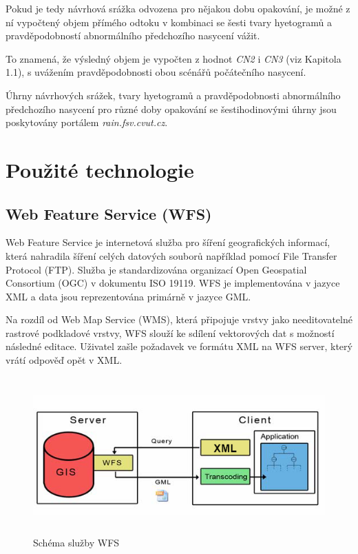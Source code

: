 \documentclass[a4paper,oneside,12pt]{book}
\begin{document}
\hspace{10mm} Pokud je tedy návrhová srážka odvozena pro nějakou dobu opakování, je možné z ní vypočtený objem přímého odtoku v kombinaci se šesti tvary  hyetogramů a pravděpodobností abnormálního předchozího nasycení vážit.

\hspace{10mm} To znamená, že výsledný objem je vypočten z hodnot \textit{CN2} i \textit{CN3} (viz Kapitola 1.1), s uvážením pravděpodobnosti obou scénářů počátečního nasycení.

\hspace{10mm} Úhrny návrhových srážek, tvary hyetogramů a pravděpodobnosti abnormálního předchozího nasycení pro různé doby opakování se šestihodinovými úhrny jsou poskytovány portálem \textit{rain.fsv.cvut.cz}.

\newpage
\newpage

\section{Použité technologie} \label{tehcnologie}

\subsection{Web Feature Service (WFS)} \label{wfs}
\hspace{10mm} Web Feature Service je internetová služba pro šíření geografických informací, která nahradila šíření celých datových souborů například pomocí File Transfer Protocol (FTP). Služba je standardizována organizací Open Geospatial Consortium (OGC) v dokumentu  ISO 19119. \cite{Vretanos2014} WFS je implementována v jazyce XML a data jsou reprezentována primárně v jazyce GML. \cite{Zhang2005}

\hspace{10mm} Na rozdíl od Web Map Service (WMS), která připojuje vrstvy jako needitovatelné rastrové podkladové vrstvy, WFS slouží ke sdílení vektorových dat s možností následné editace. Uživatel zašle požadavek ve formátu XML na WFS server, který vrátí odpověď opět v XML. \cite{Zhang2005}

\begin{figure}[ht] \label{obr5}
\centering
\includegraphics[height=6cm]{pictures/XML.png}
\caption{Schéma služby WFS \cite{Schall2009}}
\label{fig:xml}
\end{figure}
\end{document}
